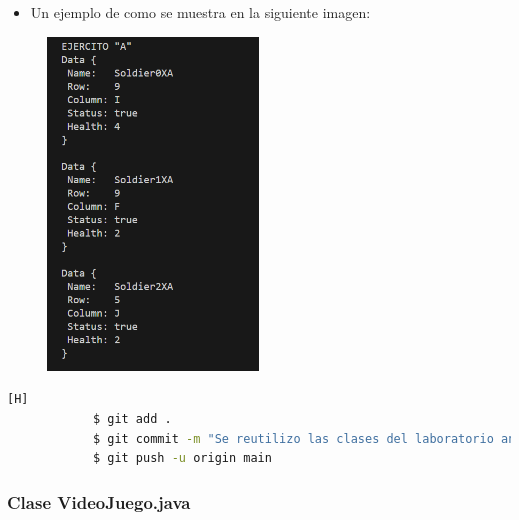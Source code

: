 \documentclass{article}
\begin{document}
        

        \begin{itemize}
            \begin{itemize}
                \item Un ejemplo de como se muestra en la siguiente imagen:
            \end{itemize}
        \end{itemize}

        \begin{figure}[H]
            \centering
            \includegraphics[width=0.5\textwidth,keepaspectratio]{img/toString.png}
            \caption{}
        \end{figure}

        
        \begin{lstlisting}[language=bash,caption={Commit: En el primer commit se reutilizaba la clase Soldado.java del laboratorio anterior}][H]
    		$ git add .
    		$ git commit -m "Se reutilizo las clases del laboratorio anterior, para en este caso realizarlo con arraylist"			
    		$ git push -u origin main
    	\end{lstlisting}
     
        
        \subsubsection{Clase VideoJuego.java}
\end{document}
